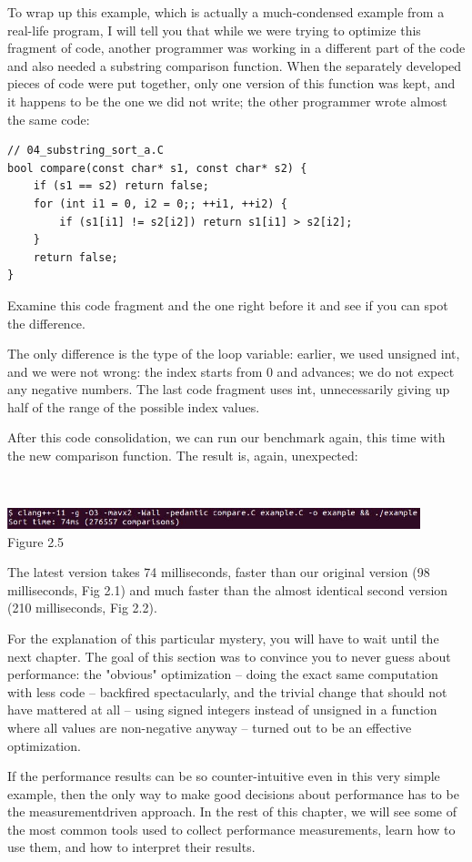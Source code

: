 To wrap up this example, which is actually a much-condensed example from a real-life program, I will tell you that while we were trying to optimize this fragment of code, another programmer was working in a different part of the code and also needed a substring comparison function. When the separately developed pieces of code were put together, only one version of this function was kept, and it happens to be the one we did not write; the other programmer wrote almost the same code:

\begin{lstlisting}[style=styleCXX]
// 04_substring_sort_a.C
bool compare(const char* s1, const char* s2) {
	if (s1 == s2) return false;
	for (int i1 = 0, i2 = 0;; ++i1, ++i2) {
		if (s1[i1] != s2[i2]) return s1[i1] > s2[i2];
	}
	return false;
}
\end{lstlisting}

Examine this code fragment and the one right before it and see if you can spot the difference.

The only difference is the type of the loop variable: earlier, we used unsigned int, and we were not wrong: the index starts from 0 and advances; we do not expect any negative numbers. The last code fragment uses int, unnecessarily giving up half of the range of the possible index values.

After this code consolidation, we can run our benchmark again, this time with the new comparison function. The result is, again, unexpected:

\hspace*{\fill} \\ %
\begin{center}
\includegraphics[width=0.9\textwidth]{content/1/chapter2/images/5.jpg}\\
Figure 2.5
\end{center}

The latest version takes 74 milliseconds, faster than our original version (98 milliseconds, Fig 2.1) and much faster than the almost identical second version (210 milliseconds, Fig 2.2).

For the explanation of this particular mystery, you will have to wait until the next chapter. The goal of this section was to convince you to never guess about performance: the "obvious" optimization – doing the exact same computation with less code – backfired spectacularly, and the trivial change that should not have mattered at all – using signed integers instead of unsigned in a function where all values are non-negative anyway – turned out to be an effective optimization.

If the performance results can be so counter-intuitive even in this very simple example, then the only way to make good decisions about performance has to be the measurementdriven approach. In the rest of this chapter, we will see some of the most common tools used to collect performance measurements, learn how to use them, and how to interpret their results.
